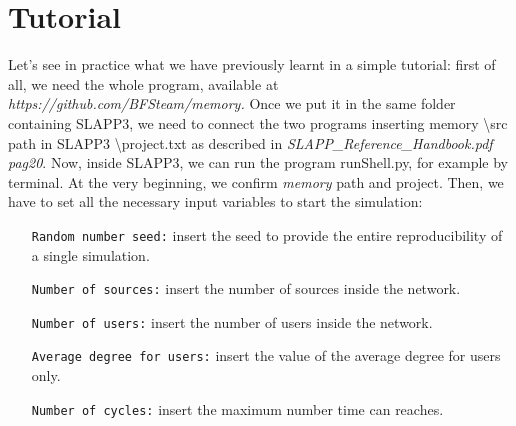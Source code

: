 \section{Tutorial}
Let's see in practice what we have previously learnt in a simple tutorial: first of all, we need the whole program, available at \textit{ https://github.com/BFSteam/memory.}
Once we put it in the same folder containing SLAPP3, we need to connect the two programs inserting memory \textbackslash src path in SLAPP3 \textbackslash project.txt as described in \textit{SLAPP\_Reference\_Handbook.pdf pag20}.
Now, inside SLAPP3, we can run the program runShell.py, for example by terminal.
At the very beginning, we confirm \textit{memory} path and project. Then, we have to set all the necessary input variables to start the simulation:
\begin{itemize}
\item[\texttt{Random number seed:}] insert the seed to provide the entire reproducibility of a single simulation.
\item[\texttt{Number of sources:}]insert the number of sources inside the network.
\item[\texttt{Number of users:}]insert the number of users inside the network.
\item[\texttt{Average degree for users:}]insert the value of the average degree for users only.
\item[\texttt{Number of cycles:}]insert the maximum number time can reaches.
\end{itemize}

